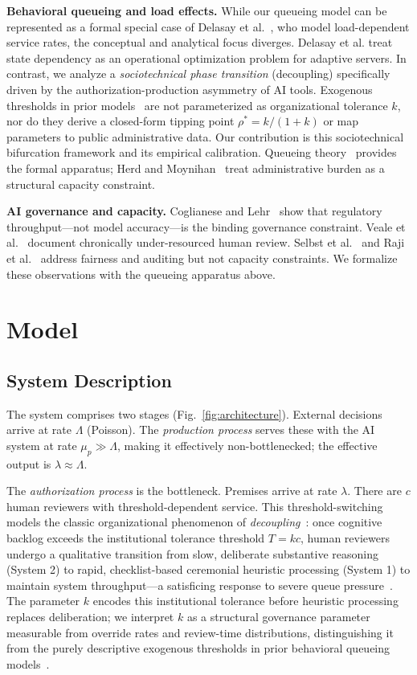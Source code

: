 \documentclass[runningheads]{llncs}
\begin{document}
\noindent\textbf{Behavioral queueing and load effects.}
While our queueing model can be represented as a formal special case of Delasay et al.~\cite{delasay2016}, who model load-dependent service rates, the conceptual and analytical focus diverges. Delasay et al. treat state dependency as an operational optimization problem for adaptive servers. In contrast, we analyze a \emph{sociotechnical phase transition} (decoupling) specifically driven by the authorization-production asymmetry of AI tools. Exogenous thresholds in prior models~\cite{delasay2016,kcterwiesch2009} are not parameterized as organizational tolerance $k$, nor do they derive a closed-form tipping point $\rho^* = k/(1+k)$ or map parameters to public administrative data. Our contribution is this sociotechnical bifurcation framework and its empirical calibration. Queueing
theory~\cite{kleinrock1975} provides the formal
apparatus; Herd and Moynihan~\cite{herd2018} treat administrative burden as a
structural capacity constraint.

\noindent\textbf{AI governance and capacity.}
Coglianese and Lehr~\cite{coglianese2017} show that regulatory throughput---not
model accuracy---is the binding governance constraint. Veale et al.~\cite{veale2018}
document chronically under-resourced human review. Selbst et al.~\cite{selbst2019}
and Raji et al.~\cite{raji2020} address fairness and auditing but not capacity
constraints. We formalize these observations with the queueing apparatus above.

\section{Model}
\label{sec:model}

\subsection{System Description}

The system comprises two stages (Fig.~\ref{fig:architecture}).
External decisions arrive at rate $\Lambda$ (Poisson). The \emph{production process}
serves these with the AI system at rate $\mu_p \gg \Lambda$, making it effectively
non-bottlenecked; the effective output is $\lambda \approx \Lambda$.

The \emph{authorization process} is the bottleneck. Premises arrive at rate
$\lambda$. There are $c$ human reviewers with threshold-dependent service.
This threshold-switching models the classic organizational phenomenon of \emph{decoupling}~\cite{meyer1977}: once cognitive backlog exceeds the institutional tolerance threshold $T = kc$, human reviewers undergo a qualitative transition from slow, deliberate substantive reasoning (System 2) to rapid, checklist-based ceremonial heuristic processing (System 1) to maintain system throughput---a satisficing response to severe queue pressure~\cite{simon1947}. The parameter $k$ encodes this institutional tolerance before heuristic processing replaces deliberation; we interpret $k$ as a structural governance parameter measurable from override rates and review-time distributions, distinguishing it from the purely descriptive exogenous thresholds in prior behavioral queueing models~\cite{delasay2016,kcterwiesch2009}.
\end{document}
